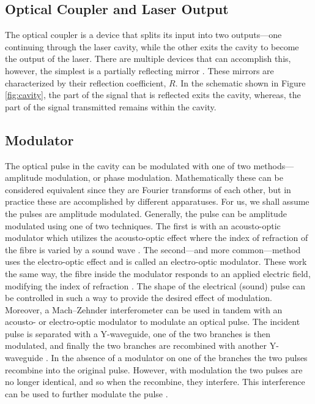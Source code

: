 \subsection{Optical Coupler and Laser Output}
The optical coupler is a device that splits its input into two outputs---one continuing through the laser cavity, while the other exits the cavity to become the output of the laser. There are multiple devices that can accomplish this, however, the simplest is a partially reflecting mirror \cite{alazzawi}. These mirrors are characterized by their reflection coefficient, $R$. In the schematic shown in Figure \ref{fig:cavity}, the part of the signal that is reflected exits the cavity, whereas, the part of the signal transmitted remains within the cavity. \\

\subsection{Modulator}
The optical pulse in the cavity can be modulated with one of two methods---amplitude modulation, or phase modulation. Mathematically these can be considered equivalent since they are Fourier transforms of each other, but in practice these are accomplished by different apparatuses. For us, we shall assume the pulses are amplitude modulated. Generally, the pulse can be amplitude modulated using one of two techniques. The first is with an acousto-optic modulator which utilizes the acousto-optic effect where the index of refraction of the fibre is varied by a sound wave \cite{hausbook, karim}. The second---and more common---method uses the electro-optic effect and is called an electro-optic modulator. These work the same way, the fibre inside the modulator responds to an applied electric field, modifying the index of refraction \cite{agrawal2002, goldstein, hausbook, karim}. The shape of the electrical (sound) pulse can be controlled in such a way to provide the desired effect of modulation. \\

Moreover, a Mach--Zehnder interferometer can be used in tandem with an acousto- or electro-optic modulator to modulate an optical pulse. The incident pulse is separated with a Y-waveguide, one of the two branches is then modulated, and finally the two branches are recombined with another Y-waveguide \cite{alazzawi, hausbook, karim}. In the absence of a modulator on one of the branches the two pulses recombine into the original pulse. However, with modulation the two pulses are no longer identical, and so when the recombine, they interfere. This interference can be used to further modulate the pulse \cite{agrawal2002, agrawal2013, hausbook, karim}. \\

